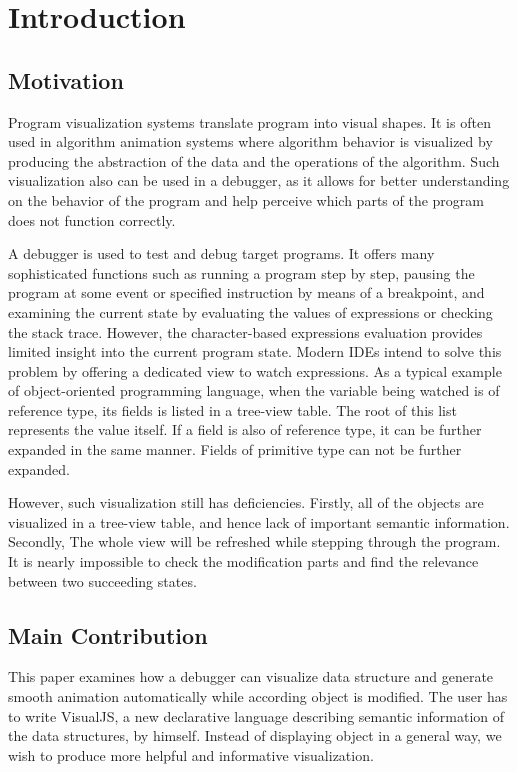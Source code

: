 \chapter {Introduction}

\section {Motivation}
Program visualization systems translate program into visual shapes. It is often used in algorithm animation systems where algorithm behavior is visualized by producing the abstraction of the data and the operations of the algorithm. Such visualization also can be used in a debugger, as it allows for better understanding on the behavior of the program and help perceive which parts of the program does not function correctly.

A debugger is used to test and debug target programs. It offers many sophisticated functions such as running a program step by step, pausing the program at some event or specified instruction by means of a breakpoint, and examining the current state by evaluating the values of expressions or checking the stack trace. However, the character-based expressions evaluation provides limited insight into the current program state. Modern IDEs intend to solve this problem by offering a dedicated view to watch expressions. As a typical example of object-oriented programming language, when the variable being watched is of reference type, its fields is listed in a tree-view table. The root of this list represents the value itself. If a field is also of reference type, it can be further expanded in the same manner. Fields of primitive type can not be further expanded.

However, such visualization still has deficiencies. Firstly, all of the objects are visualized in a tree-view table, and hence lack of important semantic information. Secondly, The whole view will be refreshed while stepping through the program. It is nearly impossible to check the modification parts and find the relevance between two succeeding states.

\section {Main Contribution}
This paper examines how a debugger can visualize data structure and generate smooth animation automatically while according object is modified. The user has to write VisualJS, a new declarative language describing semantic information of the data structures, by himself. Instead of displaying object in a general way, we wish to produce more helpful and informative visualization.

